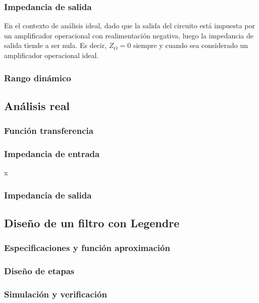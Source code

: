 \subsubsection{Impedancia de salida}
En el contexto de an\'alisis ideal, dado que la salida del circuito est\'a impuesta por un amplificador operacional con realimentaci\'on negativa,
luego la impedancia de salida tiende a ser nula. Es decir, $Z_O = 0$ siempre y cuando sea considerado un amplificador operacional ideal.

\subsubsection{Rango din\'amico}

\subsection{An\'alisis real}

\subsubsection{Funci\'on transferencia}

\subsubsection{Impedancia de entrada}x

\subsubsection{Impedancia de salida}

\subsection{Dise\~no de un filtro con Legendre}

\subsubsection{Especificaciones y funci\'on aproximaci\'on}

\subsubsection{Dise\~no de etapas}

\subsubsection{Simulaci\'on y verificaci\'on}

